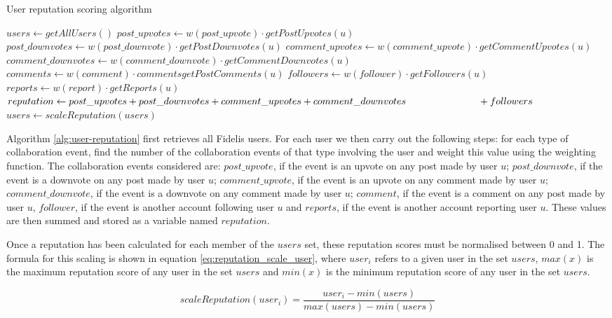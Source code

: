 \newcommand{\myindent}[1]{
\newline\makebox[#1cm]{}
}

\begin{algorithm}[H]
\caption{User reputation scoring algorithm}
\label{alg:user-reputation}
\begin{algorithmic}[1]
\State $users\gets getAllUsers()$
    \State $post\_upvotes\gets w(post\_upvote)\cdot getPostUpvotes(u)$
    \State $post\_downvotes\gets w(post\_downvote)\cdot getPostDownvotes(u)$
    \State $comment\_upvotes\gets w(comment\_upvote)\cdot getCommentUpvotes(u)$
    \State $comment\_downvotes\gets w(comment\_downvote)\cdot getCommentDownvotes(u)$
    \State $comments\gets w(comment)\cdot commentsgetPostComments(u)$
    \State $followers\gets w(follower)\cdot getFollowers(u)$
    \State $reports\gets w(report)\cdot getReports(u)$
    \State $reputation\gets post\_upvotes + post\_downvotes + comment\_upvotes + comment\_downvotes \myindent{2.6} + followers$
\EndFor
\State $users\gets scaleReputation(users)$
\end{algorithmic}
\end{algorithm}

\noindent
Algorithm \ref{alg:user-reputation} first retrieves all Fidelis users. For each user we then carry out the following steps: for each type of collaboration event, find the number of the collaboration events of that type involving the user and weight this value using the weighting function. The collaboration events considered are: \(post\_upvote\), if the event is an upvote on any post made by user \(u\); \(post\_downvote\), if the event is a downvote on any post made by user \(u\); \(comment\_upvote\), if the event is an upvote on any comment made by user \(u\); \(comment\_downvote\), if the event is a downvote on any comment made by user \(u\); \(comment\), if the event is a comment on any post made by user \(u\), \(follower\), if the event is another account following user \(u\) and \(reports\), if the event is another account reporting user \(u\). These values are then summed and stored as a variable named \(reputation\).

Once a reputation has been calculated for each member of the \(users\) set, these reputation scores must be normalised between 0 and 1. The formula for this scaling is shown in equation \ref{eq:reputation_scale_user}, where $user_i$ refers to a given user in the set \(users\), \(max(x)\) is the maximum reputation score of any user in the set \(users\) and \(min(x)\) is the minimum reputation score of any user in the set \(users\).

\begin{equation}
    \label{eq:reputation_scale_user}
    scaleReputation(user_i) = \frac{user_i - min(users)}{max(users) - min(users)}
\end{equation}
